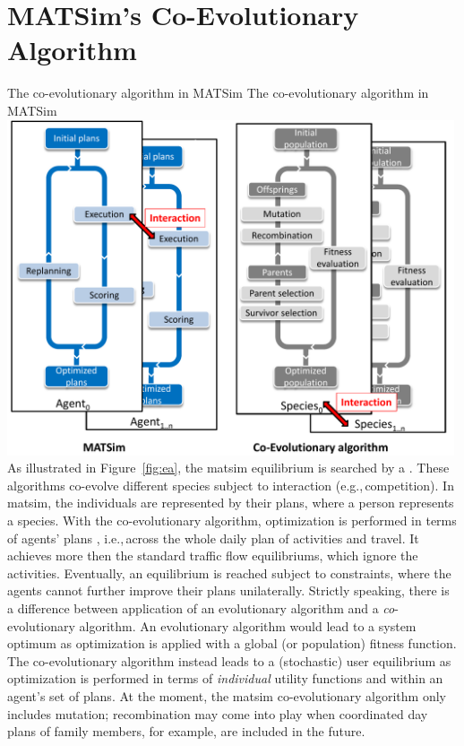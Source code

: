 \section{MATSim's Co-Evolutionary Algorithm}
\label{sec:co-ev}
%
\createfigure%
{The co-evolutionary algorithm in MATSim}%
{The co-evolutionary algorithm in MATSim}%
{\label{fig:ea}}%
{\includegraphics[width=0.99\textwidth, angle=0]{using/figures/MATSimVSea.pdf}}%
{}
%
%
As illustrated in Figure~\ref{fig:ea}, the \gls{matsim} equilibrium is searched by a \emph{} \citep[see e.g.,][]{PopoviciEtAl_2012}. These \glspl{algorithm} co-evolve different species subject to interaction (e.g.,\,competition). In \gls{matsim}, the individuals are represented by their plans, where a person represents a species. With the co-evolutionary algorithm, optimization is performed in terms of agents' plans , i.e.,\,across the whole daily plan of activities and travel. It achieves more then the standard traffic flow \glspl{equilibrium}, which ignore the activities. Eventually, an equilibrium is reached subject to constraints, where the agents cannot further improve their plans unilaterally. Strictly speaking, there is a difference between application of an evolutionary algorithm and a \emph{co}-evolutionary algorithm. An evolutionary algorithm would lead to a system optimum as optimization is applied with a global (or population) fitness function. The co-evolutionary algorithm instead leads to a (stochastic) user \gls{equilibrium} as optimization is performed in terms of \emph{individual} utility functions and within an agent's set of plans. At the moment, the \gls{matsim} co-evolutionary algorithm only includes mutation; recombination may come into play when coordinated day plans of family members, for example, are included in the future.

